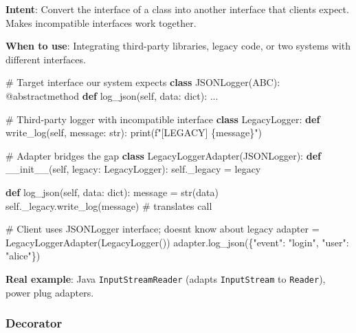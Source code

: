 \documentclass[11pt]{article}
\newenvironment{Shaded}{\begin{snugshade}}{\end{snugshade}}
\newcommand{\AttributeTok}[1]{\textcolor[rgb]{0.16,0.50,0.73}{#1}}
\newcommand{\BuiltInTok}[1]{\textcolor[rgb]{0.50,0.55,0.55}{#1}}
\newcommand{\CommentTok}[1]{\textcolor[rgb]{0.48,0.49,0.49}{#1}}
\newcommand{\FunctionTok}[1]{\textcolor[rgb]{0.56,0.27,0.68}{#1}}
\newcommand{\KeywordTok}[1]{\textcolor[rgb]{0.81,0.81,0.76}{\textbf{#1}}}
\newcommand{\NormalTok}[1]{\textcolor[rgb]{0.81,0.81,0.76}{#1}}
\newcommand{\OperatorTok}[1]{\textcolor[rgb]{0.81,0.81,0.76}{#1}}
\newcommand{\SpecialCharTok}[1]{\textcolor[rgb]{0.24,0.68,0.91}{#1}}
\newcommand{\SpecialStringTok}[1]{\textcolor[rgb]{0.85,0.27,0.33}{#1}}
\newcommand{\StringTok}[1]{\textcolor[rgb]{0.96,0.31,0.31}{#1}}
\newcommand{\VariableTok}[1]{\textcolor[rgb]{0.15,0.68,0.68}{#1}}
\begin{document}
\textbf{Intent}: Convert the interface of a class into another interface that clients expect. Makes incompatible interfaces work together.

\textbf{When to use}: Integrating third-party libraries, legacy code, or two systems with different interfaces.


\begin{Shaded}
\begin{Highlighting}[]
\CommentTok{\# Target interface our system expects}
\KeywordTok{class}\NormalTok{ JSONLogger(ABC):}
    \AttributeTok{@abstractmethod}
    \KeywordTok{def}\NormalTok{ log\_json(}\VariableTok{self}\NormalTok{, data: }\BuiltInTok{dict}\NormalTok{): ...}

\CommentTok{\# Third{-}party logger with incompatible interface}
\KeywordTok{class}\NormalTok{ LegacyLogger:}
    \KeywordTok{def}\NormalTok{ write\_log(}\VariableTok{self}\NormalTok{, message: }\BuiltInTok{str}\NormalTok{):}
        \BuiltInTok{print}\NormalTok{(}\SpecialStringTok{f"[LEGACY] }\SpecialCharTok{\{}\NormalTok{message}\SpecialCharTok{\}}\SpecialStringTok{"}\NormalTok{)}

\CommentTok{\# Adapter bridges the gap}
\KeywordTok{class}\NormalTok{ LegacyLoggerAdapter(JSONLogger):}
    \KeywordTok{def} \FunctionTok{\_\_init\_\_}\NormalTok{(}\VariableTok{self}\NormalTok{, legacy: LegacyLogger):}
        \VariableTok{self}\NormalTok{.\_legacy }\OperatorTok{=}\NormalTok{ legacy}

    \KeywordTok{def}\NormalTok{ log\_json(}\VariableTok{self}\NormalTok{, data: }\BuiltInTok{dict}\NormalTok{):}
\NormalTok{        message }\OperatorTok{=} \BuiltInTok{str}\NormalTok{(data)}
        \VariableTok{self}\NormalTok{.\_legacy.write\_log(message)   }\CommentTok{\# translates call}

\CommentTok{\# Client uses JSONLogger interface; doesn\textquotesingle{}t know about legacy}
\NormalTok{adapter }\OperatorTok{=}\NormalTok{ LegacyLoggerAdapter(LegacyLogger())}
\NormalTok{adapter.log\_json(\{}\StringTok{"event"}\NormalTok{: }\StringTok{"login"}\NormalTok{, }\StringTok{"user"}\NormalTok{: }\StringTok{"alice"}\NormalTok{\})}
\end{Highlighting}
\end{Shaded}

\textbf{Real example}: Java \texttt{InputStreamReader} (adapts \texttt{InputStream} to \texttt{Reader}), power plug adapters.

\subsubsection{Decorator}\label{decorator}
\end{document}
